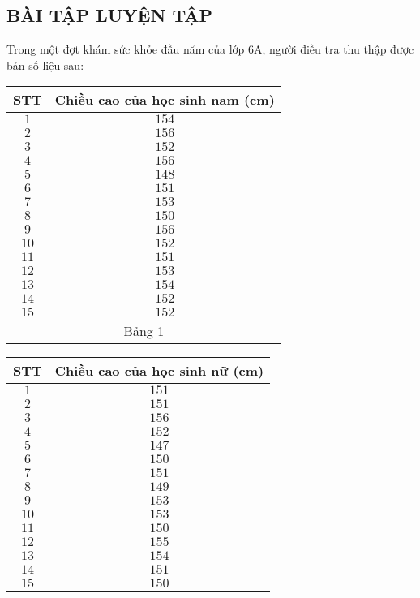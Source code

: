 \subsection{BÀI TẬP LUYỆN TẬP}
\begin{bt}%
	Trong một đợt khám sức khỏe đầu năm của lớp $6$A, người điều tra thu thập được bản số liệu sau:\\
	\begin{tabular}{ |c|c|}
		\hline
		\textbf{STT} & \textbf{Chiều cao của học sinh nam} (cm)\\
		\hline
		$1$& $154$ \\
		$2$& $156$ \\
		$3$& $152$ \\
		$4$& $156$ \\
		$5$& $148$ \\
		$6$& $151$ \\
		$7$& $153$ \\
		$8$& $150$ \\
		$9$& $156$ \\
		$10$& $152$ \\
		$11$& $151$ \\
		$12$& $153$ \\
		$13$& $154$ \\
		$14$& $152$ \\
		$15$& $152$ \\
		\hline
		\multicolumn{2}{c}{Bảng 1}
	\end{tabular}
	\vspace{2cm}
	\begin{tabular}{ |c|c|}
		\hline
		\textbf{STT} & \textbf{Chiều cao của học sinh nữ} (cm)\\
		\hline
		$1$& $151$ \\
		$2$& $151$ \\
		$3$& $156$ \\
		$4$& $152$ \\
		$5$& $147$ \\
		$6$& $150$ \\
		$7$& $151$ \\
		$8$& $149$ \\
		$9$& $153$ \\
		$10$& $153$ \\
		$11$& $150$ \\
		$12$& $155$ \\
		$13$& $154$ \\
		$14$& $151$ \\
		$15$& $150$ \\

\end{tabular}
\end{bt}
